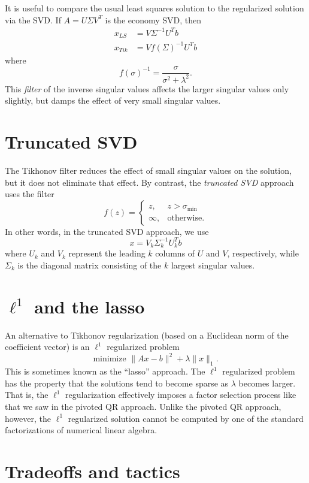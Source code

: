 \documentclass[12pt, leqno]{article} %
\begin{document}
It is useful to compare the usual least squares solution to the
regularized solution via the SVD.  If $A = U \Sigma V^T$ is the
economy SVD, then
\begin{align*}
  x_{LS} &= V \Sigma^{-1} U^T b \\
  x_{Tik} &= V f(\Sigma)^{-1} U^T b
\end{align*}
where
\[
  f(\sigma)^{-1} = \frac{\sigma}{\sigma^2 + \lambda^2}.
\]
This {\em filter} of the inverse singular values affects the larger
singular values only slightly, but damps the effect of very small
singular values.

\section{Truncated SVD}

The Tikhonov filter reduces the effect of small singular values on
the solution, but it does not eliminate that effect.  By contrast,
the {\em truncated SVD} approach uses the filter
\[
f(z) =
\begin{cases}
  z, & z > \sigma_{\min} \\
  \infty, & \mbox{otherwise}.
\end{cases}
\]
In other words, in the truncated SVD approach, we use
\[
  x = V_k \Sigma_k^{-1} U_k^T b
\]
where $U_k$ and $V_k$ represent the leading $k$ columns of $U$ and
$V$, respectively, while $\Sigma_k$ is the diagonal matrix consisting
of the $k$ largest singular values.

\section{$\ell^1$ and the lasso}

An alternative to Tikhonov regularization (based on a Euclidean norm
of the coefficient vector) is an $\ell^1$ regularized problem
\[
  \mbox{minimize } \|Ax-b\|^2 + \lambda \|x\|_1.
\]
This is sometimes known as the ``lasso'' approach.  The $\ell^1$
regularized problem has the property that the solutions tend to
become sparse as $\lambda$ becomes larger.  That is, the $\ell^1$
regularization effectively imposes a factor selection process like
that we saw in the pivoted QR approach.  Unlike the pivoted QR
approach, however, the $\ell^1$ regularized solution cannot be
computed by one of the standard factorizations of numerical linear
algebra.

\section{Tradeoffs and tactics}
\end{document}
